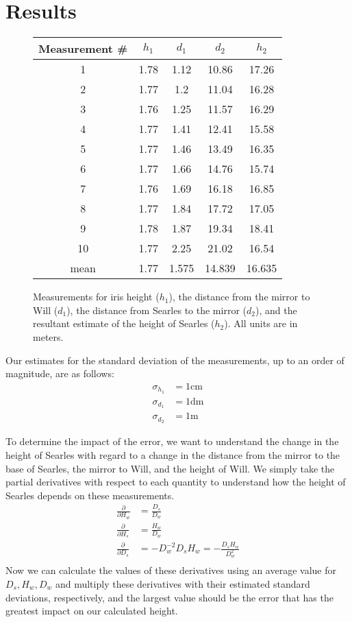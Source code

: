 \documentclass[11pt]{article}
\begin{document}
\section{Results}
\begin{figure}
\centering
\begin{tabular}{ccccc}
\toprule
Measurement \# & $h_1$ & $d_1$ & $d_2$ & $h_2$ \\
\midrule
1 & 1.78 & 1.12 & 10.86 & 17.26 \\
2 & 1.77 & 1.2 & 11.04 & 16.28 \\
3 & 1.76 & 1.25 & 11.57 & 16.29 \\
4 & 1.77 & 1.41 & 12.41 & 15.58 \\
5 & 1.77 & 1.46 & 13.49 & 16.35 \\
6 & 1.77 & 1.66 & 14.76 & 15.74 \\
7 & 1.76 & 1.69 & 16.18 & 16.85 \\
8 & 1.77 & 1.84 & 17.72 & 17.05 \\
9 & 1.78 & 1.87 & 19.34 & 18.41 \\
10 & 1.77 & 2.25 & 21.02 & 16.54 \\
\midrule
mean & 1.77 & 1.575 & 14.839 & 16.635 \\
\bottomrule
\end{tabular}
\caption{Measurements for iris height ($h_1$), the distance from the mirror to Will ($d_1$), the distance from Searles to the mirror ($d_2$), and the resultant estimate of the height of Searles ($h_2$). All units are in meters.}
\end{figure}
Our estimates for the standard deviation of the measurements, up to an order of magnitude, are as follows:
\begin{align*}
\sigma_{h_1} &= 1\text{cm} \\
\sigma_{d_1} &= 1\text{dm} \\
\sigma_{d_2} &= 1\text{m}
\end{align*}

To determine the impact of the error, we want to understand the change in the height of Searles with regard to a change in the distance from the mirror to the base of Searles, the mirror to Will, and the height of Will. We simply take the partial derivatives with respect to each quantity to understand how the height of Searles depends on these measurements. \\
\begin{align*}
    \frac{\partial}{\partial H_w} &= \frac{D_s}{D_w} \\
	\frac{\partial}{\partial H_s} &= \frac{H_w}{D_w} \\
	\frac{\partial}{\partial D_s} &= -D_w^{-2}D_sH_w = -\frac{D_sH_w}{D_w^2} \\
\end{align*}
Now we can calculate the values of these derivatives using an average value for $D_s, H_w, D_w$ and multiply these derivatives with their estimated standard deviations, respectively, and the largest value should be the error that has the greatest impact on our calculated height.




\end{document}
